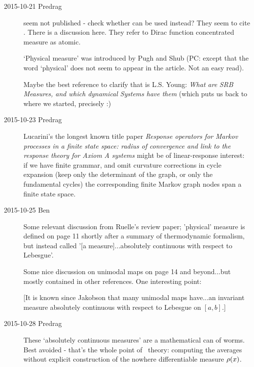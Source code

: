 \begin{description}

\item[2015-10-21 Predrag]
 seem not published - check whether
 can be used instead? They seem to cite
. There is a discussion
{here}. They refer to Dirac function concentrated measure  as atomic.

`Physical measure' was introduced by Pugh and Shub (PC:
except that the word `physical' does not seem to appear in the article.
Not an easy read).

Maybe the best reference to clarify that is L.S. Young:
\emph{What are SRB Measures, and which dynamical Systems have them}
(which puts us back to where we started, precisely :)

\item[2015-10-23 Predrag]
Lucarini's the longest known title paper
{\em Response operators for {Markov} processes in a finite state
             space: radius of convergence and link to
             the response theory for {Axiom A} systems}
might be of linear-response interest: if we have finite grammar, and omit
curvature corrections in cycle expansion (keep only the determinant of
the graph, or only the fundamental cycles) the corresponding finite
Markov graph nodes span a finite state space.

\item[2015-10-25 Ben]
Some relevant discussion from Ruelle's review paper; 'physical'
measure is defined on page 11 shortly after a summary of
thermodynamic formalism, but instead called
'[a measure]...absolutely continuous with respect to Lebesgue'.

Some nice discussion on unimodal maps on page 14 and beyond...but mostly
contained in other references. One interesting point:

[It is known since Jakobson that many unimodal maps
have...an invariant measure absolutely continuous with respect to
Lebesgue on $[a,b]$.]


\item[2015-10-28 Predrag]
These `absolutely continuous measures' are a mathematical can of worms.
Best avoided - that's the whole point of \po\ theory: computing the
averages without explicit construction of the nowhere differentiable
measure ${\rho}(x)$.


\end{description}
